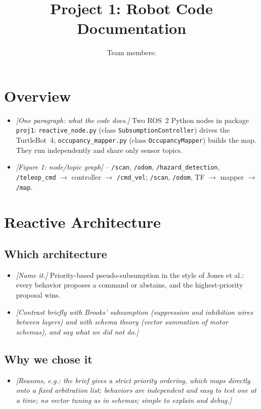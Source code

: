 \documentclass[11pt]{article}
\title{Project 1: Robot Code Documentation}
\author{Team members: \prompt{names}}
\date{\prompt{date}}
\newcommand{\prompt}[1]{\textit{[#1]}}
\begin{document}
\maketitle

\section{Overview}
\begin{itemize}
  \item \prompt{One paragraph: what the code does.} Two ROS~2 Python nodes in
        package \texttt{proj1}: \texttt{reactive\_node.py}
        (class \texttt{SubsumptionController}) drives the TurtleBot~4;
        \texttt{occupancy\_mapper.py} (class \texttt{OccupancyMapper})
        builds the map. They run independently and share only sensor topics.
  \item \prompt{Figure 1: node/topic graph} --
        \texttt{/scan}, \texttt{/odom}, \texttt{/hazard\_detection},
        \texttt{/teleop\_cmd} $\rightarrow$ controller $\rightarrow$
        \texttt{/cmd\_vel}; \texttt{/scan}, \texttt{/odom}, TF
        $\rightarrow$ mapper $\rightarrow$ \texttt{/map}.
\end{itemize}

\section{Reactive Architecture}
\subsection{Which architecture}
\begin{itemize}
  \item \prompt{Name it.} Priority-based pseudo-subsumption in the style of
        Jones et al.: every behavior proposes a command or abstains, and the
        highest-priority proposal wins.
  \item \prompt{Contrast briefly with Brooks' subsumption (suppression and
        inhibition wires between layers) and with schema theory (vector
        summation of motor schemas), and say what we did not do.}
\end{itemize}

\subsection{Why we chose it}
\begin{itemize}
  \item \prompt{Reasons, e.g.: the brief gives a strict priority ordering,
        which maps directly onto a fixed arbitration list; behaviors are
        independent and easy to test one at a time; no vector tuning as in
        schemas; simple to explain and debug.}
\end{itemize}
\end{document}
